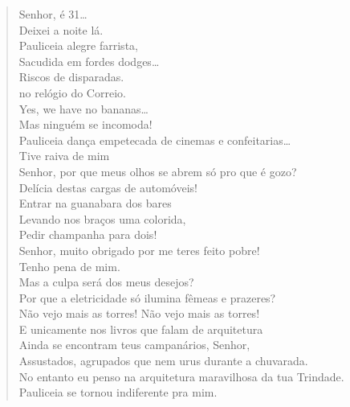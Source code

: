 \begin{verse}
Senhor, é 31\ldots{}\\
Deixei a noite lá.\\
\qquad\quad Pauliceia alegre farrista,\\
\qquad\quad Sacudida em fordes dodges\ldots{}\\
\qquad\qquad\qquad\qquad\qquad Riscos de disparadas.\\
\qquad\qquad{} no relógio do Correio.\\
\qquad\qquad\qquad Yes, we have no bananas\ldots{}\\
\qquad\quad Mas ninguém se incomoda!\\
\qquad\quad Pauliceia dança empetecada de cinemas e confeitarias\ldots{}\\
Tive raiva de mim\\
Senhor, por que meus olhos se abrem só pro que é gozo?\\
Delícia destas cargas de automóveis!\\
Entrar na guanabara dos bares\\
Levando nos braços uma colorida,\\
Pedir champanha para dois!\\
Senhor, muito obrigado por me teres feito pobre!\\
Tenho pena de mim.\\
Mas a culpa será dos meus desejos?\\
Por que a eletricidade só ilumina fêmeas e prazeres?\\
Não vejo mais as torres! Não vejo mais as torres!\\
E unicamente nos livros que falam de arquitetura\\
Ainda se encontram teus campanários, Senhor,\\
Assustados, agrupados que nem urus durante a chuvarada.\\
No entanto eu penso na arquitetura maravilhosa da tua Trindade.\\
Pauliceia se tornou indiferente pra mim.


\end{verse}
